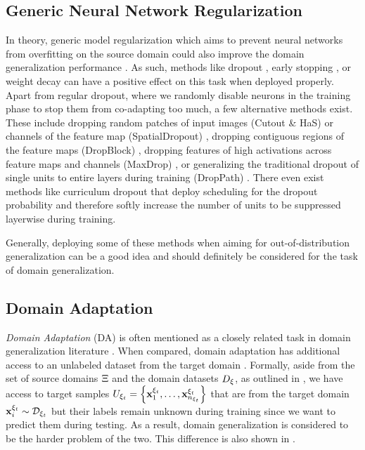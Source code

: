 \subsection{Generic Neural Network Regularization}

In theory, generic model regularization which aims to prevent neural networks from overfitting on the source domain could also improve the domain generalization performance \citep{huang2020selfchallenging}. As such, methods like dropout \citep{SrivastavaHKSS14}, early stopping \citep{CaruanaLG00}, or weight decay \citep{NowlanH92} can have a positive effect on this task when deployed properly. Apart from regular dropout, where we randomly disable neurons in the training phase to stop them from co-adapting too much, a few alternative methods exist. These include dropping random  patches of input images (Cutout \& HaS) \citep{devries2017improved, SinghL17} or channels of the feature map (SpatialDropout) \citep{TompsonGJLB15}, dropping contiguous regions of the feature maps (DropBlock) \citep{GhiasiLL18}, dropping features of high activations across feature maps and channels (MaxDrop) \citep{ParkK16}, or generalizing the traditional dropout of single units to entire layers during training (DropPath) \citep{LarssonMS17}. There even exist methods like curriculum dropout \citep{MorerioCVVM17} that deploy scheduling for the dropout probability and therefore softly increase the number of units to be suppressed layerwise during training. 

Generally, deploying some of these methods when aiming for out-of-distribution generalization can be a good idea and should definitely be considered for the task of domain generalization.


\subsection{Domain Adaptation}

\emph{Domain Adaptation} (DA) is often mentioned as a closely related task in domain generalization literature \citep{MotiianPAD17, VolpiM19, QiaoZP20}. When compared, domain adaptation has additional access to an unlabeled dataset from the target domain \citep{mancini2020, Csurka17}. Formally, aside from the set of source domains $\Xi$ and the domain datasets $D_\xi$, as outlined in , we have access to target samples $U_{\xi_t} = \left\{\mathbf{x}_1^{\xi_t},\dots,\mathbf{x}_{n_{\xi_t}}^{\xi_t}\right\}$ that are from the target domain $\mathbf{x}_i^{\xi_t} \sim \mathcal{D}_{\xi_t}$ but their labels remain unknown during training since we want to predict them during testing. As a result, domain generalization is considered to be the harder problem of the two. This difference is also shown in .

